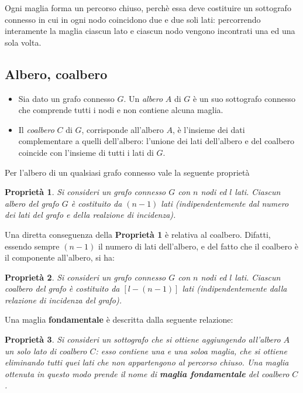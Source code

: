 \documentclass[a4paper]{report}
\newtheorem{prop}{Propriet\`a}
\begin{document}
Ogni maglia forma un percorso chiuso, perch\`e essa deve costituire un
sottografo connesso in cui in ogni nodo coincidono due e due soli
lati: percorrendo interamente la maglia ciascun lato e ciascun nodo
vengono incontrati una ed una sola volta.

\subsection{Albero, coalbero}

\begin{itemize}
\item Sia dato un grafo connesso $G$. Un \emph{albero} $A$ di $G$ \`e
  un suo sottografo connesso che comprende tutti i nodi e non
  contiene alcuna maglia.
\item Il \emph{coalbero} $C$ di $G$, corrisponde all'albero $A$, \`e
  l'insieme dei dati complementare a quelli dell'albero: l'unione dei
  lati dell'albero e del coalbero coincide con l'insieme di tutti i
  lati di $G$.
\end{itemize}

Per l'albero di un qualsiasi grafo connesso vale la seguente
propriet\`a

\begin{prop}
  Si consideri un grafo connesso $G$ con $n$ nodi ed $l$ lati. Ciascun
  albero del grafo $G$ \`e costituito da $(n-1)$ lati
  (indipendentemente dal numero dei lati del grafo e della realzione
  di incidenza).
\end{prop}

Una diretta conseguenza della {\bf Propriet\`a 1} \`e relativa al
coalbero. Difatti, essendo sempre $(n-1)$ il numero di lati
dell'albero, e del fatto che il coalbero \`e il componente all'albero,
si ha:

\begin{prop}
  Si consideri un grafo connesso $G$ con $n$ nodi ed $l$ lati. Ciascun
  coalbero del grafo \`e costituito da $[l-(n-1)]$ lati
  (indipendentemente dalla relazione di incidenza del grafo).
\end{prop}

Una maglia {\bf fondamentale} \`e descritta dalla seguente relazione:

\begin{prop}
  Si consideri un sottografo che si ottiene aggiungendo all'albero $A$
  un solo lato di coalbero $C$: esso contiene una e una soloa maglia,
  che si ottiene eliminando tutti quei lati che non appartengono al
  percorso chiuso. Una maglia ottenuta in questo modo prende il nome
  di {\bf maglia fondamentale} del coalbero $C$.
\end{prop}
\end{document}
